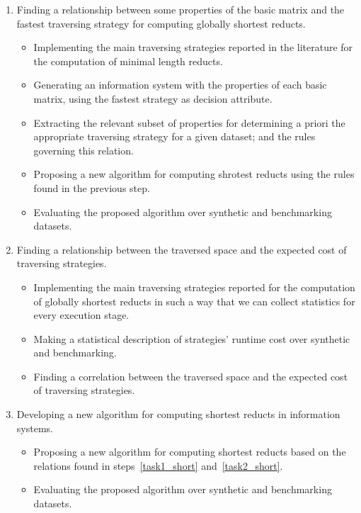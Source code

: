 \documentclass[authoryear,11pt]{elsarticle}
\begin{document}
\begin{enumerate}
  	\item Finding a relationship between some properties of the basic matrix and the fastest 
  		  traversing strategy for computing globally shortest reducts.\label{task1_short}
	\begin{itemize}
  		\item Implementing the main traversing strategies reported in the literature for the computation of 
  			  minimal length reducts.
  		\item Generating an information system with the properties of each basic matrix, using 
  			  the fastest strategy as decision attribute.
  		\item Extracting the relevant subset of properties for determining a priori the appropriate 
  			  traversing strategy for a given dataset; and the rules governing this relation.
  		\item Proposing a new algorithm for computing shrotest reducts using the rules found in
  			  the previous step.
  		\item Evaluating the proposed algorithm over synthetic and benchmarking datasets.
  	\end{itemize}
  	\item Finding a relationship between the traversed space and the expected cost of traversing strategies.
  	\label{task2_short}
  	\begin{itemize}
  		\item Implementing the main traversing strategies reported for the computation of globally shortest 
  			  reducts in such a way that we can collect statistics for every execution stage.
  		\item Making a statistical description  of strategies' runtime cost over synthetic and benchmarking.
  		\item Finding a correlation between the traversed space and the expected cost of traversing strategies.
  	\end{itemize}
  	\item Developing a new algorithm for computing shortest reducts in information systems.
  	\begin{itemize}
  		\item Proposing a new algorithm for computing shortest reducts based on the relations found in 
  			  steps~\ref{task1_short} and~\ref{task2_short}.
  		\item Evaluating the proposed algorithm over synthetic and benchmarking datasets.
  	\end{itemize}

\end{enumerate}
\end{document}
